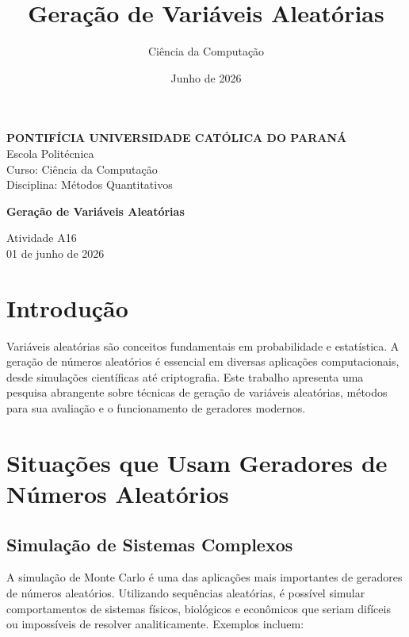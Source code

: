 \documentclass[12pt,a4paper]{article}
\title{\textbf{Geração de Variáveis Aleatórias}}
\author{Ciência da Computação}
\date{Junho de 2026}
\begin{document}
\begin{titlepage}
\begin{center}
\large
\textbf{PONTIFÍCIA UNIVERSIDADE CATÓLICA DO PARANÁ} \\
Escola Politécnica \\
Curso: Ciência da Computação \\
Disciplina: Métodos Quantitativos \\

\vspace{3cm}

\Large
\textbf{Geração de Variáveis Aleatórias} \\

\vspace{3cm}

\normalsize
Atividade A16 \\
01 de junho de 2026 \\

\vfill

\end{center}
\end{titlepage}

\tableofcontents
\newpage

\section{Introdução}

Variáveis aleatórias são conceitos fundamentais em probabilidade e estatística. A geração de números aleatórios é essencial em diversas aplicações computacionais, desde simulações científicas até criptografia. Este trabalho apresenta uma pesquisa abrangente sobre técnicas de geração de variáveis aleatórias, métodos para sua avaliação e o funcionamento de geradores modernos.

\newpage

\section{Situações que Usam Geradores de Números Aleatórios}

\subsection{Simulação de Sistemas Complexos}

A simulação de Monte Carlo é uma das aplicações mais importantes de geradores de números aleatórios. Utilizando sequências aleatórias, é possível simular comportamentos de sistemas físicos, biológicos e econômicos que seriam difíceis ou impossíveis de resolver analiticamente. Exemplos incluem:
\end{document}
